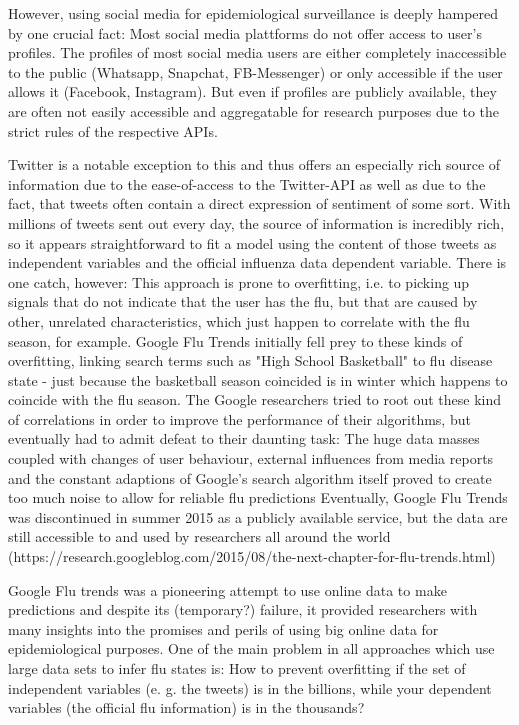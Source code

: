 \documentclass[11pt, a4paper]{report}\usepackage[]{graphicx}\usepackage[]{color}
\begin{document}
However, using social media for epidemiological surveillance is deeply hampered by one crucial fact: Most social media plattforms do not offer access to user's profiles. The profiles of most social media users are either completely inaccessible to the public (Whatsapp, Snapchat, FB-Messenger) or only accessible if the user allows it (Facebook, Instagram). But even if profiles are publicly available, they are often not easily accessible and aggregatable for research purposes due to the strict rules of the respective APIs.\newline

Twitter is a notable exception to this and thus offers an especially rich source of information due to the ease-of-access to the Twitter-API as well as due to the fact, that tweets often contain a direct expression of sentiment of some sort. With millions of tweets  sent out every day, the source of information is incredibly rich, so it appears straightforward to fit a model using the content of those tweets as independent variables and the official influenza data dependent variable. 
There is one catch, however: This approach is prone to overfitting, i.e. to picking up signals that do not indicate that the user has the flu, but that are caused by other, unrelated characteristics, which just happen to correlate with the flu season, for example. Google Flu Trends \citep{ginsberg_detecting_2009} initially fell prey to these kinds of overfitting, linking search terms such as "High School Basketball" to flu disease state - just because the basketball season coincided is in winter which happens to coincide with the flu season. The Google researchers tried to root out these kind of correlations in order to improve the performance of their algorithms, but eventually had to admit defeat to their daunting task: The huge data masses coupled with changes of user behaviour, external influences from media reports and the constant adaptions of Google's search algorithm itself proved to create too much noise to allow for reliable flu predictions \citep{olson_reassessing_2013,butler_when_2013,lazer_parable_2014,} Eventually, Google Flu Trends was discontinued in summer 2015 as a publicly available service, but the data are still accessible to and used by researchers all around the world (https://research.googleblog.com/2015/08/the-next-chapter-for-flu-trends.html)\newline

Google Flu trends was a pioneering attempt to use online data to make predictions and despite its (temporary?) failure, it provided researchers with many insights into the promises and perils of using big online data for epidemiological purposes. One of the main problem in all approaches which use large data sets to infer flu states is: How to prevent overfitting if the set of independent variables (e. g. the tweets) is in the billions, while your dependent variables (the official flu information) is in the thousands?\newline
\end{document}
